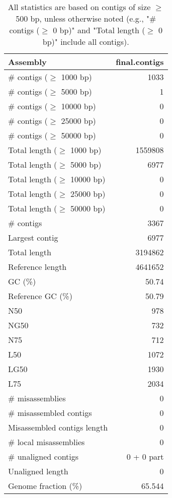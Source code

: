 \documentclass[12pt,a4paper]{article}
\begin{document}
\begin{table}[ht]
\begin{center}
\caption{All statistics are based on contigs of size $\geq$ 500 bp, unless otherwise noted (e.g., "\# contigs ($\geq$ 0 bp)" and "Total length ($\geq$ 0 bp)" include all contigs).}
\begin{tabular}{|l*{1}{|r}|}
\hline
Assembly & final.contigs \\ \hline
\# contigs ($\geq$ 1000 bp) & 1033 \\ \hline
\# contigs ($\geq$ 5000 bp) & 1 \\ \hline
\# contigs ($\geq$ 10000 bp) & 0 \\ \hline
\# contigs ($\geq$ 25000 bp) & 0 \\ \hline
\# contigs ($\geq$ 50000 bp) & 0 \\ \hline
Total length ($\geq$ 1000 bp) & 1559808 \\ \hline
Total length ($\geq$ 5000 bp) & 6977 \\ \hline
Total length ($\geq$ 10000 bp) & 0 \\ \hline
Total length ($\geq$ 25000 bp) & 0 \\ \hline
Total length ($\geq$ 50000 bp) & 0 \\ \hline
\# contigs & 3367 \\ \hline
Largest contig & 6977 \\ \hline
Total length & 3194862 \\ \hline
Reference length & 4641652 \\ \hline
GC (\%) & 50.74 \\ \hline
Reference GC (\%) & 50.79 \\ \hline
N50 & 978 \\ \hline
NG50 & 732 \\ \hline
N75 & 712 \\ \hline
L50 & 1072 \\ \hline
LG50 & 1930 \\ \hline
L75 & 2034 \\ \hline
\# misassemblies & 0 \\ \hline
\# misassembled contigs & 0 \\ \hline
Misassembled contigs length & 0 \\ \hline
\# local misassemblies & 0 \\ \hline
\# unaligned contigs & 0 + 0 part \\ \hline
Unaligned length & 0 \\ \hline
Genome fraction (\%) & 65.544 \\ \hline

\end{tabular}
\end{center}
\end{table}
\end{document}
